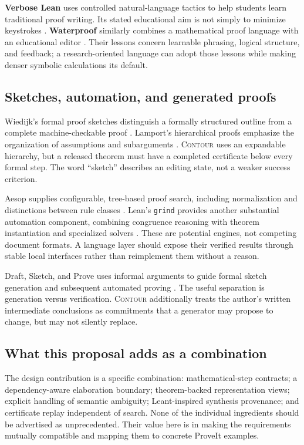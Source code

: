 \documentclass[11pt,a4paper]{article}
\newcommand{\codeid}[1]{\nolinkurl{#1}}
\newcommand{\contour}{\textsc{Contour}}
\begin{document}
\textbf{Verbose Lean} uses controlled natural-language tactics to help students learn traditional proof writing. Its stated educational aim is not simply to minimize keystrokes \cite{verbose}. \textbf{Waterproof} similarly combines a mathematical proof language with an educational editor \cite{waterproof}. Their lessons concern learnable phrasing, logical structure, and feedback; a research-oriented language can adopt those lessons while making denser symbolic calculations its default.

\subsection{Sketches, automation, and generated proofs}

Wiedijk's formal proof sketches distinguish a formally structured outline from a complete machine-checkable proof \cite{sketches}. Lamport's hierarchical proofs emphasize the organization of assumptions and subarguments \cite{lamport}. \contour{} uses an expandable hierarchy, but a released theorem must have a completed certificate below every formal step. The word ``sketch'' describes an editing state, not a weaker success criterion.

Aesop supplies configurable, tree-based proof search, including normalization and distinctions between rule classes \cite{aesop}. Lean's \codeid{grind} provides another substantial automation component, combining congruence reasoning with theorem instantiation and specialized solvers \cite{grind}. These are potential engines, not competing document formats. A language layer should expose their verified results through stable local interfaces rather than reimplement them without a reason.

Draft, Sketch, and Prove uses informal arguments to guide formal sketch generation and subsequent automated proving \cite{dsp}. The useful separation is generation versus verification. \contour{} additionally treats the author's written intermediate conclusions as commitments that a generator may propose to change, but may not silently replace.

\subsection{What this proposal adds as a combination}

The design contribution is a specific combination: mathematical-step contracts; a dependency-aware elaboration boundary; theorem-backed representation views; explicit handling of semantic ambiguity; Leant-inspired synthesis provenance; and certificate replay independent of search. None of the individual ingredients should be advertised as unprecedented. Their value here is in making the requirements mutually compatible and mapping them to concrete ProveIt examples.
\end{document}
